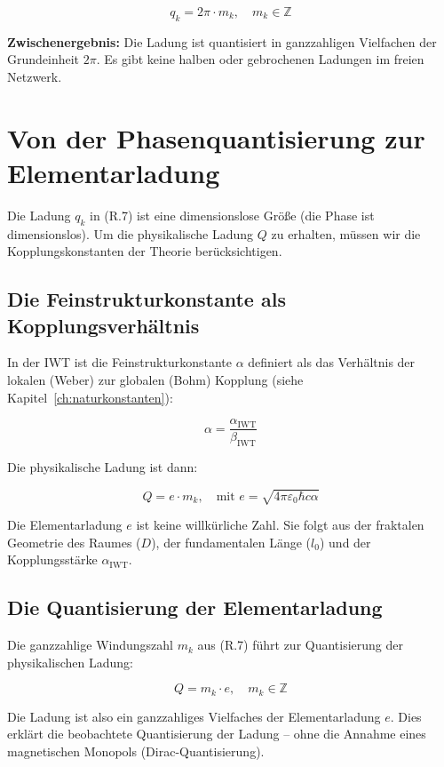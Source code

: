 \[
q_k = 2\pi \cdot m_k, \quad m_k \in \mathbb{Z}
\tag{R.7}
\]

\textbf{Zwischenergebnis:} Die Ladung ist quantisiert in ganzzahligen Vielfachen der Grundeinheit \( 2\pi \). Es gibt keine halben oder gebrochenen Ladungen im freien Netzwerk.

\section{Von der Phasenquantisierung zur Elementarladung}
\label{app:phasenquantisierung_elementarladung}

Die Ladung \( q_k \) in (R.7) ist eine dimensionslose Größe (die Phase ist dimensionslos). Um die physikalische Ladung \( Q \) zu erhalten, müssen wir die Kopplungskonstanten der Theorie berücksichtigen.

\subsection{Die Feinstrukturkonstante als Kopplungsverhältnis}
\label{sub:phasenquantisierung_fsk}

In der IWT ist die Feinstrukturkonstante \( \alpha \) definiert als das Verhältnis der lokalen (Weber) zur globalen (Bohm) Kopplung (siehe Kapitel~\ref{ch:naturkonstanten}):

\[
\alpha = \frac{\alpha_{\text{IWT}}}{\beta_{\text{IWT}}}
\tag{R.8}
\]

Die physikalische Ladung ist dann:

\[
Q = e \cdot m_k, \quad \text{mit } e = \sqrt{4\pi\varepsilon_0 \hbar c \alpha}
\tag{R.9}
\]

Die Elementarladung \( e \) ist keine willkürliche Zahl. Sie folgt aus der fraktalen Geometrie des Raumes (\( D \)), der fundamentalen Länge (\( l_0 \)) und der Kopplungsstärke \( \alpha_{\text{IWT}} \).

\subsection{Die Quantisierung der Elementarladung}
\label{sub:phasenquantisierung_quantisierung_e}

Die ganzzahlige Windungszahl \( m_k \) aus (R.7) führt zur Quantisierung der physikalischen Ladung:

\[
Q = m_k \cdot e, \quad m_k \in \mathbb{Z}
\tag{R.10}
\]

Die Ladung ist also ein ganzzahliges Vielfaches der Elementarladung \( e \). Dies erklärt die beobachtete Quantisierung der Ladung – ohne die Annahme eines magnetischen Monopols (Dirac-Quantisierung).

